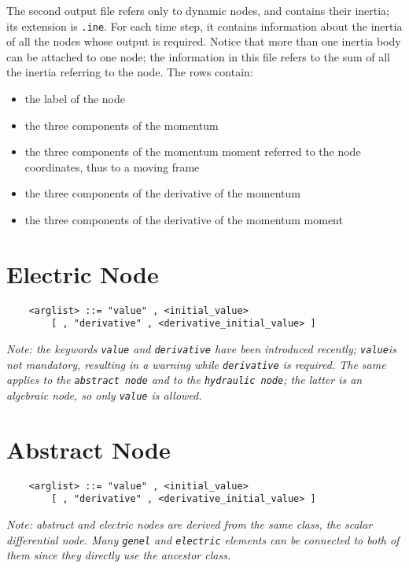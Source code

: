 \noindent
The second output file refers only to dynamic nodes, and contains their
inertia; its extension is \texttt{.ine}.
For each time step, it contains information about the inertia of all the
nodes whose output is required.
Notice that more than one inertia body can be attached to one node; the
information in this file refers to the sum of all the inertia referring to
the node.
The rows contain:
\begin{itemize}
    \item the label of the node
    \item the three components of the momentum
    \item the three components of the momentum moment referred to the node
    coordinates, thus to a moving frame
    \item the three components of the derivative of the momentum
    \item the three components of the derivative of the momentum moment
\end{itemize}


\section{Electric Node}
\begin{verbatim}
    <arglist> ::= "value" , <initial_value> 
        [ , "derivative" , <derivative_initial_value> ]
\end{verbatim}
\emph{Note: the keywords \texttt{value} and \texttt{derivative}
have been introduced recently; \texttt{value}is not mandatory,
resulting in a warning while \texttt{derivative} is required.
The same applies to the \texttt{abstract node} 
and to the \texttt{hydraulic node}; the latter is an algebraic
node, so only \texttt{value} is allowed.
}





\section{Abstract Node}
\begin{verbatim}
    <arglist> ::= "value" , <initial_value>
        [ , "derivative" , <derivative_initial_value> ]
\end{verbatim}
{\em
    Note: abstract and electric nodes are derived from the same class, the
    scalar differential node. Many \texttt{genel} and \texttt{electric} elements 
    can be connected to both of them since they directly use the ancestor
    class. 
}

